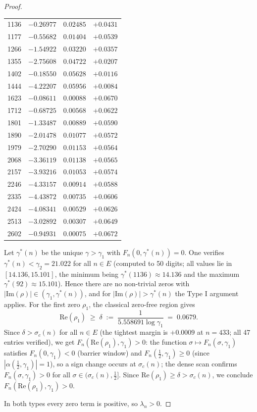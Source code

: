 \documentclass[11pt]{article}
\begin{document}
\begin{proof}
\begin{center}
\begin{tabular}{rrrr}
1136 & $-0.26977$ & $0.02485$ & $+0.0431$ \\
1177 & $-0.55682$ & $0.01404$ & $+0.0539$ \\
1266 & $-1.54922$ & $0.03220$ & $+0.0357$ \\
1355 & $-2.75608$ & $0.04722$ & $+0.0207$ \\
1402 & $-0.18550$ & $0.05628$ & $+0.0116$ \\
1444 & $-4.22207$ & $0.05956$ & $+0.0084$ \\
1623 & $-0.08611$ & $0.00088$ & $+0.0670$ \\
1712 & $-0.68725$ & $0.00568$ & $+0.0622$ \\
1801 & $-1.33487$ & $0.00889$ & $+0.0590$ \\
1890 & $-2.01478$ & $0.01077$ & $+0.0572$ \\
1979 & $-2.70290$ & $0.01153$ & $+0.0564$ \\
2068 & $-3.36119$ & $0.01138$ & $+0.0565$ \\
2157 & $-3.93216$ & $0.01053$ & $+0.0574$ \\
2246 & $-4.33157$ & $0.00914$ & $+0.0588$ \\
2335 & $-4.43872$ & $0.00735$ & $+0.0606$ \\
2424 & $-4.08341$ & $0.00529$ & $+0.0626$ \\
2513 & $-3.02892$ & $0.00307$ & $+0.0649$ \\
2602 & $-0.94931$ & $0.00075$ & $+0.0672$ \\
\bottomrule
\end{tabular}
\end{center}

Let $\gamma^*(n)$ be the unique $\gamma > \gamma_1$ with $F_n(0,\gamma^*(n)) = 0$.
One verifies $\gamma^*(n) < \gamma_2 = 21.022$ for all $n \in E$
(computed to 50 digits; all values lie in $[14.136, 15.101]$, the minimum being $\gamma^*(1136) \approx 14.136$ and the maximum $\gamma^*(92) \approx 15.101$).
Hence there are no non-trivial zeros with $|\mathrm{Im}(\rho)| \in (\gamma_1, \gamma^*(n))$,
and for $|\mathrm{Im}(\rho)| > \gamma^*(n)$ the Type I argument applies.
For the first zero $\rho_1$, the classical zero-free region \cite{mty2022} gives
\[
  \mathrm{Re}(\rho_1) \;\geq\; \delta \;:=\; \frac{1}{5.558691\log\gamma_1} \;=\; 0.0679.
\]
Since $\delta > \sigma_c(n)$ for all $n \in E$ (the tightest margin is $+0.0009$ at $n=433$; all 47 entries verified),
we get $F_n(\mathrm{Re}(\rho_1),\gamma_1) > 0$:
the function $\sigma \mapsto F_n(\sigma,\gamma_1)$ satisfies $F_n(0,\gamma_1) < 0$ (barrier window)
and $F_n(\tfrac{1}{2},\gamma_1) \ge 0$ (since $|\alpha(\tfrac{1}{2},\gamma_1)|=1$),
so a sign change occurs at $\sigma_c(n)$; the dense scan confirms $F_n(\sigma,\gamma_1) > 0$
for all $\sigma \in (\sigma_c(n), \tfrac{1}{2}]$. Since $\mathrm{Re}(\rho_1) \ge \delta > \sigma_c(n)$,
we conclude $F_n(\mathrm{Re}(\rho_1),\gamma_1) > 0$.

In both types every zero term is positive, so $\lambda_n > 0$.
\end{proof}
\end{document}
